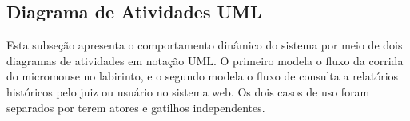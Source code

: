 %
%
%    
%        

    \subsection{Diagrama de Atividades UML}

    Esta subseção apresenta o comportamento dinâmico do sistema por meio de dois diagramas de atividades em notação UML. O primeiro modela o fluxo da corrida do micromouse no labirinto, e o segundo modela o fluxo de consulta a relatórios históricos pelo juiz ou usuário no sistema web. Os dois casos de uso foram separados por terem atores e gatilhos independentes.

